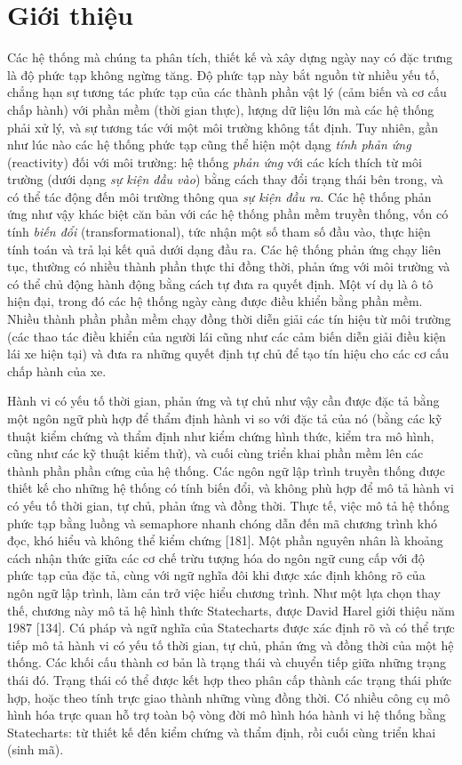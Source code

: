 \section{Giới thiệu}
Các hệ thống mà chúng ta phân tích, thiết kế và xây dựng ngày nay có đặc trưng là độ phức tạp không ngừng tăng. Độ phức tạp này bắt nguồn từ nhiều yếu tố, chẳng hạn sự tương tác phức tạp của các thành phần vật lý (cảm biến và cơ cấu chấp hành) với phần mềm (thời gian thực), lượng dữ liệu lớn mà các hệ thống phải xử lý, và sự tương tác với một môi trường không tất định. Tuy nhiên, gần như lúc nào các hệ thống phức tạp cũng thể hiện một dạng \emph{tính phản ứng} (reactivity) đối với môi trường: hệ thống \emph{phản ứng} với các kích thích từ môi trường (dưới dạng \emph{sự kiện đầu vào}) bằng cách thay đổi trạng thái bên trong, và có thể tác động đến môi trường thông qua \emph{sự kiện đầu ra}. Các hệ thống phản ứng như vậy khác biệt căn bản với các hệ thống phần mềm truyền thống, vốn có tính \emph{biến đổi} (transformational), tức nhận một số tham số đầu vào, thực hiện tính toán và trả lại kết quả dưới dạng đầu ra. Các hệ thống phản ứng
chạy liên tục, thường có nhiều thành phần thực thi đồng thời, phản ứng với môi trường và có thể chủ động hành động bằng cách tự đưa ra quyết định. Một ví dụ là ô tô hiện đại, trong đó các hệ thống ngày càng được điều khiển bằng phần mềm. Nhiều thành phần phần mềm chạy đồng thời diễn giải các tín hiệu từ môi trường (các thao tác điều khiển của người lái cũng như các cảm biến diễn giải điều kiện lái xe hiện tại) và đưa ra những quyết định tự chủ để tạo tín hiệu cho các cơ cấu chấp hành của xe.

Hành vi có yếu tố thời gian, phản ứng và tự chủ như vậy cần được đặc tả bằng một ngôn ngữ phù hợp để thẩm định hành vi so với đặc tả của nó (bằng các kỹ thuật kiểm chứng và thẩm định như kiểm chứng hình thức, kiểm tra mô hình, cũng như các kỹ thuật kiểm thử), và cuối cùng triển khai phần mềm lên các thành phần phần cứng của hệ thống. Các ngôn ngữ lập trình truyền thống được thiết kế cho những hệ thống có tính biến đổi, và không phù hợp để mô tả hành vi có yếu tố thời gian, tự chủ, phản ứng và đồng thời. Thực tế, việc mô tả hệ thống phức tạp bằng luồng và semaphore nhanh chóng dẫn đến mã chương trình khó đọc, khó hiểu và không thể kiểm chứng [181]. Một phần nguyên nhân là khoảng cách nhận thức giữa các cơ chế trừu tượng hóa do ngôn ngữ cung cấp với độ phức tạp của đặc tả, cùng với ngữ nghĩa đôi khi được xác định không rõ của ngôn ngữ lập trình, làm cản trở việc hiểu chương trình. Như một lựa chọn thay thế, chương này mô tả hệ hình thức Statecharts, được David Harel giới thiệu năm 1987 [134]. Cú pháp và ngữ nghĩa của Statecharts được xác định rõ và có thể trực tiếp mô tả hành vi có yếu tố thời gian, tự chủ, phản ứng và đồng thời của một hệ thống. Các khối cấu thành cơ bản là trạng thái và chuyển tiếp giữa những trạng thái đó. Trạng thái có thể được kết hợp theo phân cấp thành các trạng thái phức hợp, hoặc theo tính trực giao thành những vùng đồng thời. Có nhiều công cụ mô hình hóa trực quan hỗ trợ toàn bộ vòng đời mô hình hóa hành vi hệ thống bằng Statecharts: từ thiết kế đến kiểm chứng và thẩm định, rồi cuối cùng triển khai (sinh mã).

